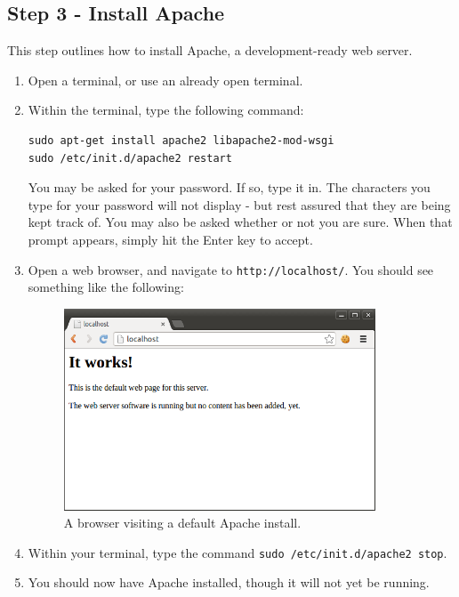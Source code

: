 \documentclass{article}
\begin{document}
\subsection{Step 3 - Install Apache}
This step outlines how to install Apache, a development-ready web server.
\begin{enumerate}
\item Open a terminal, or use an already open terminal.
\item Within the terminal, type the following command:
\begin{verbatim}
sudo apt-get install apache2 libapache2-mod-wsgi
sudo /etc/init.d/apache2 restart
\end{verbatim}
You may be asked for your password. If so, type it in. The characters you type for your password
will not display - but rest assured that they are being kept track of. You
may also be asked whether or not you are sure. When that prompt appears, simply hit the Enter key
to accept.
\pagebreak
\item Open a web browser, and navigate to \verb+http://localhost/+. You should see something like the following:


\begin{figure}[h!]
\centering \includegraphics[height=6cm]{pic3.png} \caption{A browser visiting a default Apache install.}
\end{figure}

\item Within your terminal, type the command \verb+sudo /etc/init.d/apache2 stop+.
\item You should now have Apache installed, though it will not yet be running.
\end{enumerate}
\end{document}
